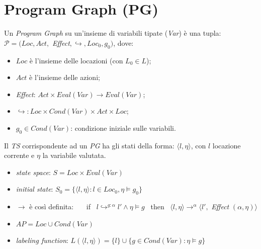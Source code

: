 \documentclass[a4paper, notitlepage, 9pt]{extreport}
\begin{document}
\section*{Program Graph (PG)}
Un \textit{Program Graph} su un'insieme di variabili tipate (\textit{Var}) è una tupla: $\mathcal{P} = (Loc, Act,$ \textit{Effect}$, \hookrightarrow, Loc_0, g_0)$, dove:
\begin{itemize}
	\item $Loc$ è l'insieme delle locazioni (con $L_0 \in L$);
	\item $Act$ è l'insieme delle azioni;
	\item \textit{Effect}: $Act \times Eval(Var) \rightarrow Eval(Var)$;
	\item $\hookrightarrow: Loc \times Cond(Var) \times Act \times Loc$;
	\item $g_0 \in Cond(Var)$: condizione iniziale sulle variabili.
\end{itemize}
Il \textit{TS} corrispondente ad un \textit{PG} ha gli stati della forma: $\langle l, \eta \rangle$, con $l$ locazione corrente e $\eta$ la variabile valutata.
\begin{itemize}
	\item \textit{state space}: $S = Loc \times Eval(Var)$
	\item \textit{initial state}: $S_0 = \{\langle l, \eta \rangle : l \in Loc_0, \eta \vDash g_0 \}$
	\item $\longrightarrow$ è così definita: ~~~if~ $l \hookrightarrow^{g:\alpha} l' \land \eta \vDash g$ ~then~ $\langle l, \eta \rangle \rightarrow^\alpha \langle l',$ \textit{Effect} $(\alpha, \eta) \rangle $
	\item $AP = Loc \cup Cond(Var)$
	\item \textit{labeling function}: $L(\langle l, \eta \rangle) = \{l \} \cup \{g \in Cond(Var): \eta \vDash g \}$
\end{itemize}
\end{document}
